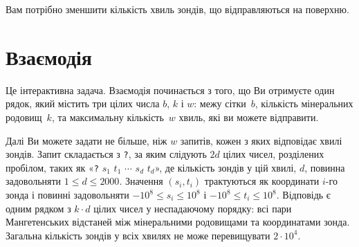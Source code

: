 Вам потрібно зменшити кількість хвиль зондів, що відправляються на поверхню.


\section*{Взаємодія}


Це інтерактивна задача.
Взаємодія починається з того, що Ви отримуєте один рядок, який містить три цілих числа $b$, $k$ і $w$:
межу сітки~$b$,
кількість мінеральних родовищ~$k$,
та максимальну кількість~$w$ хвиль, які ви можете відправити.

Далі Ви можете задати не більше, ніж $w$ запитів, кожен з яких відповідає хвилі зондів.
Запит складається з \texttt{?}, за яким слідують $2d$ цілих чисел, розділених пробілом, таких як «\texttt{?} $s_1$ $t_1$ $\cdots$ $s_d$ $t_d$», де кількість зондів у цій хвилі, $d$, повинна задовольняти
$1\leq d\leq 2000$. %
Значення $(s_i,t_i)$ трактуються як координати $i$-го зонда і повинні задовольняти
$-10^8 \leq s_i \leq 10^8$ і $-10^8 \leq t_i \leq 10^8$. %
Відповідь є одним рядком з $k \cdot d$ цілих чисел у неспадаючому порядку: всі пари Мангетенських відстаней між мінеральними родовищами та координатами зонда.
Загальна кількість зондів у всіх хвилях не може перевищувати
$2\cdot 10^4.$ %

